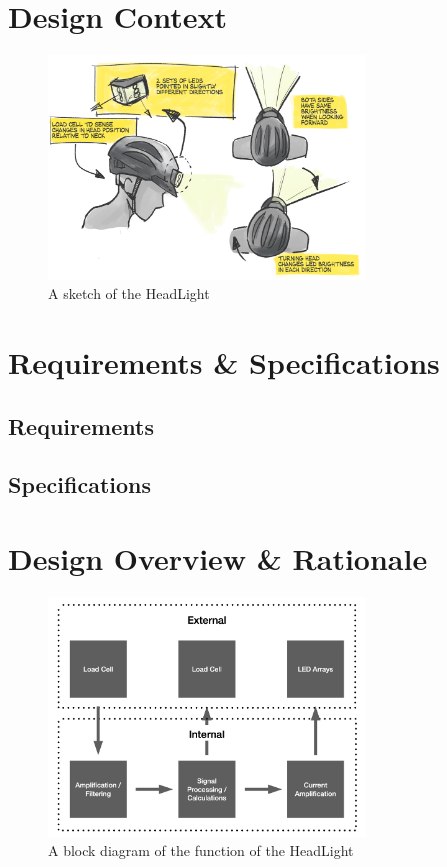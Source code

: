 \documentclass[twoside]{article}
\begin{document}
\section{Design Context}
    \noindent
    \begin{figure}[H]
        \centering
        \includegraphics[width=0.75\textwidth]{headlamp-project-concept.png}
        \caption{A sketch of the HeadLight}
        \label{fig:sketch}
    \end{figure}

\section{Requirements \& Specifications}
    \subsection{Requirements}
    \subsection{Specifications}

\section{Design Overview \& Rationale}
    \noindent
    \begin{figure}[H]
        \centering
        \includegraphics[width=0.75\textwidth]{block_diagram.png}
        \caption{A block diagram of the function of the HeadLight}
        \label{fig:block}
    \end{figure}
\end{document}
